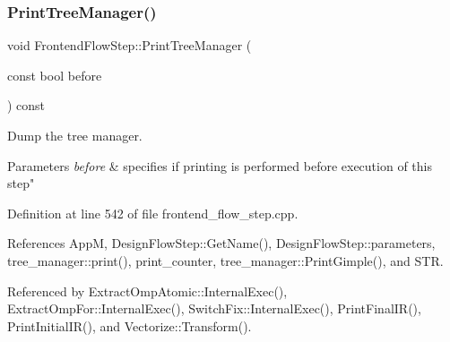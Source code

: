 \subsubsection{\texorpdfstring{Print\+Tree\+Manager()}{PrintTreeManager()}}
{\footnotesize\ttfamily void Frontend\+Flow\+Step\+::\+Print\+Tree\+Manager (\begin{DoxyParamCaption}\item[{const bool}]{before }\end{DoxyParamCaption}) const}



Dump the tree manager. 


\begin{DoxyParams}{Parameters}
{\em before} & specifies if printing is performed before execution of this step" \\
\hline
\end{DoxyParams}


Definition at line 542 of file frontend\+\_\+flow\+\_\+step.\+cpp.



References AppM, Design\+Flow\+Step\+::\+Get\+Name(), Design\+Flow\+Step\+::parameters, tree\+\_\+manager\+::print(), print\+\_\+counter, tree\+\_\+manager\+::\+Print\+Gimple(), and S\+TR.



Referenced by Extract\+Omp\+Atomic\+::\+Internal\+Exec(), Extract\+Omp\+For\+::\+Internal\+Exec(), Switch\+Fix\+::\+Internal\+Exec(), Print\+Final\+I\+R(), Print\+Initial\+I\+R(), and Vectorize\+::\+Transform().

